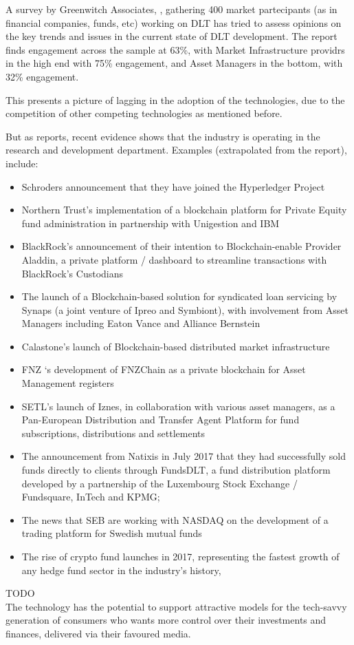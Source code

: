 A survey by Greenwitch Associates, \cite{greenwitchdltreport}, gathering 400 market partecipants (as in financial companies, funds, etc) working on DLT has tried to assess opinions on the key trends and issues in the current state of DLT development. The report finds engagement across the sample at 63\%, with Market Infrastructure providrs in the high end with 75\% engagement, and Asset Managers in the bottom, with 32\% engagement.

This presents a picture of lagging in the adoption of the technologies, due to the competition of other competing technologies as mentioned before. 

But as \cite{ibmdltreport} reports, recent evidence shows that the industry is operating in the research and development department. 
Examples (extrapolated from the report), include:

\begin{itemize}
    \item Schroders announcement that they have joined the Hyperledger Project
    \item Northern Trust’s implementation of a blockchain platform for Private Equity fund administration in partnership with Unigestion and IBM
    \item BlackRock’s announcement of their intention to Blockchain-enable Provider Aladdin, a private platform / dashboard to streamline transactions with BlackRock’s Custodians
    \item The launch of a Blockchain-based solution for syndicated loan servicing by Synaps (a joint venture of Ipreo and Symbiont), with involvement from Asset Managers including Eaton Vance and Alliance Bernstein
    \item Calastone’s launch of Blockchain-based distributed market infrastructure
    \item FNZ ‘s development of FNZChain as a private blockchain for Asset Management registers
    \item SETL’s launch of Iznes, in collaboration with various asset managers, as a Pan-European Distribution and Transfer Agent Platform for fund subscriptions, distributions and
    settlements
    \item The announcement from Natixis in July 2017 that they had successfully sold funds directly to clients through FundsDLT, a fund distribution platform developed by a partnership of the Luxembourg Stock Exchange / Fundsquare, InTech and KPMG;
    \item The news that SEB are working with NASDAQ on the development of a trading platform for Swedish mutual funds
    \item The rise of crypto fund launches in 2017, representing the fastest growth of any hedge fund sector in the industry’s history, \cite{hedgefundcryptoreport}
\end{itemize}

TODO\\

The technology has the potential to support attractive models for the tech-savvy generation of consumers who wants more control over their investments and finances, delivered via their favoured media.